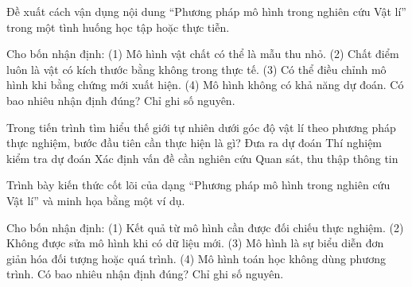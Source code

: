 \begin{bt}
Đề xuất cách vận dụng nội dung “Phương pháp mô hình trong nghiên cứu Vật lí” trong một tình huống học tập hoặc thực tiễn.
\end{bt}

\begin{ex}
Cho bốn nhận định: (1) Mô hình vật chất có thể là mẫu thu nhỏ. (2) Chất điểm luôn là vật có kích thước bằng không trong thực tế. (3) Có thể điều chỉnh mô hình khi bằng chứng mới xuất hiện. (4) Mô hình không có khả năng dự đoán. Có bao nhiêu nhận định đúng? Chỉ ghi số nguyên.
\end{ex}

\begin{ex}
Trong tiến trình tìm hiểu thế giới tự nhiên dưới góc độ vật lí theo phương pháp thực nghiệm, bước đầu tiên cần thực hiện là gì?
\choice
{Đưa ra dự đoán}
{Thí nghiệm kiểm tra dự đoán}
{\True Xác định vấn đề cần nghiên cứu}
{Quan sát, thu thập thông tin}
\end{ex}

\begin{bt}
Trình bày kiến thức cốt lõi của dạng “Phương pháp mô hình trong nghiên cứu Vật lí” và minh họa bằng một ví dụ.
\end{bt}

\begin{ex}
Cho bốn nhận định: (1) Kết quả từ mô hình cần được đối chiếu thực nghiệm. (2) Không được sửa mô hình khi có dữ liệu mới. (3) Mô hình là sự biểu diễn đơn giản hóa đối tượng hoặc quá trình. (4) Mô hình toán học không dùng phương trình. Có bao nhiêu nhận định đúng? Chỉ ghi số nguyên.
\end{ex}

